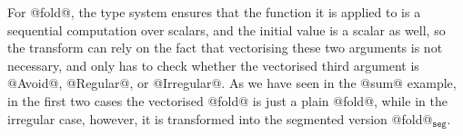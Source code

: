 For @fold@, the type system ensures that the function it is applied to is a sequential computation over scalars, and the initial value is a scalar as well, so the transform can rely on the fact that vectorising these two arguments is not necessary, and only has to check whether the vectorised third argument is @Avoid@, @Regular@, or @Irregular@. As we have seen in the @sum@ example, in the first two cases the vectorised @fold@ is just a plain @fold@, while in the irregular case, however, it is transformed into the segmented version @fold@$_\texttt{seg}$.


%


